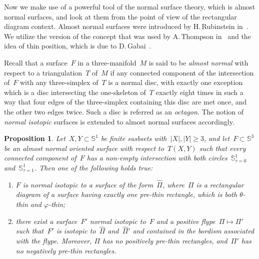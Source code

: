 \documentclass{amsart}
\theoremstyle{theorem}
\newtheorem{prop}[theo]{Proposition}
\theoremstyle{remark}
\theoremstyle{definition}
\numberwithin{equation}{section}
\numberwithin{figure}{section}
\begin{document}
Now we make use of a powerful tool of the normal surface theory, which is almost normal surfaces,
and look at them from the point of view of the rectangular diagram context. Almost normal surfaces
were introduced by H.\,Rubinstein in~\cite{rubinstein}. We utilize the version of the concept
that was used by A.\,Thompson in~\cite{thompson} and the idea of thin position, which is due to D.\,Gabai~\cite{gabai-87}.

Recall that a surface~$F$ in a three-manifold~$M$ is said to be \emph{almost normal} with respect to a
triangulation~$T$ of~$M$ if any connected component of the intersection of~$F$ with any three-simplex of~$T$
is a normal disc, with exactly one exception which is a disc intersecting the one-skeleton of~$T$
exactly eight times in such a way that four edges of the three-simplex containing this disc
are met once, and the other two edges twice. Such a disc is referred as an \emph{octagon}.
The notion of \emph{normal isotopic} surfaces is extended to almost normal surfaces
accordingly.

\begin{prop}\label{almost-norm-rect-prop}
Let~$X,Y\subset\mathbb S^1$ be finite susbsets with~$|X|,|Y|\geqslant3$, and let~$F\subset\mathbb S^3$
be an almost normal oriented surface with respect to~$T(X,Y)$ such that every connected component of~$F$
has a non-empty intersection with both circles~$\mathbb S^1_{\tau=0}$ and~$\mathbb S^1_{\tau=1}$. Then one of
the following holds true\emph:
\begin{enumerate}
\item
$F$ is normal isotopic to a surface of the form~$\widehat\Pi$, where~$\Pi$ is a rectangular diagram of a surface
having exactly one pre-thin rectangle, which is both $\theta$-thin and $\varphi$-thin\emph;
\item
there exist a surface~$F'$ normal isotopic to~$F$ and a positive flype~$\Pi\mapsto\Pi'$ such that~$F'$
is isotopic to~$\widehat\Pi$ and~$\widehat\Pi'$ and
contained in the bordism associated with the flype. Moreover, $\Pi$ has no positively pre-thin rectangles, and~$\Pi'$
has no negatively pre-thin rectangles.
\end{enumerate}
\end{prop}
\end{document}
